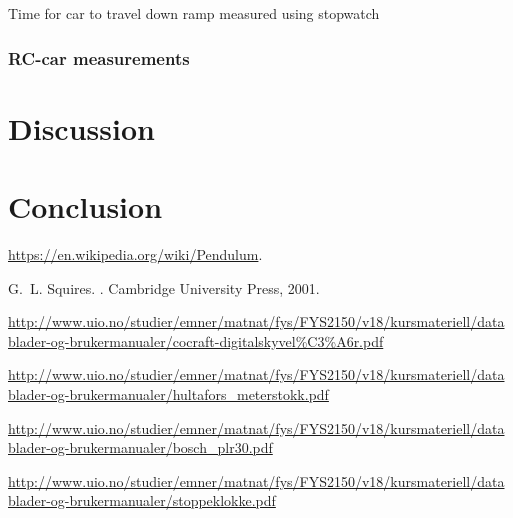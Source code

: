 \documentclass[11pt,a4paper]{article}
\begin{document}
\begin{figure}[H]
      \caption{}%
      \label{fig:legocar}%
    \end{figure}

  \begin{table}[H]
    \center
    \caption{Time for car to travel down ramp measured using stopwatch}
    \label{tab:pendel}
    
  \end{table}

  \subsubsection{RC-car measurements}


\section{\label{sec:disc}Discussion}
\section{\label{sec:conc}Conclusion}


\begin{thebibliography}{1}

\url{https://en.wikipedia.org/wiki/Pendulum}.

G.~L. Squires.
.
\newblock Cambridge University Press, 2001.

\url{http://www.uio.no/studier/emner/matnat/fys/FYS2150/v18/kursmateriell/datablader-og-brukermanualer/cocraft-digitalskyvel%C3%A6r.pdf}

\url{http://www.uio.no/studier/emner/matnat/fys/FYS2150/v18/kursmateriell/datablader-og-brukermanualer/hultafors_meterstokk.pdf}

\url{http://www.uio.no/studier/emner/matnat/fys/FYS2150/v18/kursmateriell/datablader-og-brukermanualer/bosch_plr30.pdf}

\url{http://www.uio.no/studier/emner/matnat/fys/FYS2150/v18/kursmateriell/datablader-og-brukermanualer/stoppeklokke.pdf}

\end{thebibliography}
\end{document}
